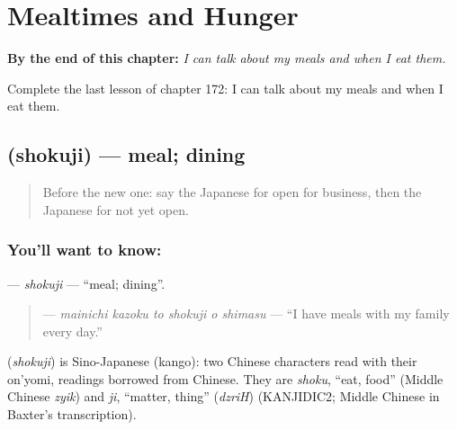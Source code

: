 
\chapter{Mealtimes and Hunger}
\label{ch:ja-mealtimes-and-hunger}

\begin{chapteropening}
\textbf{By the end of this chapter:} \emph{I can talk about my meals and when I eat them.}

Complete the last lesson of chapter 172: I can talk about my meals and when I eat them.
\end{chapteropening}

\section[\texorpdfstring{\ja{しょくじ} (shokuji)}{しょくじ (shokuji)}]{ (shokuji) — meal; dining}

\label{lesson:JA-C172-shokuji}



\begin{quote}
Before the new one: say the Japanese for open for business, then the Japanese for not yet open.
\end{quote}

\subsection*{You'll want to know: }
\textbf{} — \emph{shokuji} — \textquotedblleft{}meal; dining\textquotedblright{}.

\begin{quote}
\textbf{   } — \emph{mainichi kazoku to shokuji o shimasu} — \textquotedblleft{}I have meals with my family every day.\textquotedblright{}
\end{quote}

\begin{cousinweb}
\textbf{} (\emph{shokuji}) is Sino-Japanese (kango): two Chinese characters read with their on'yomi, readings borrowed from Chinese. They are \emph{shoku}, \textquotedblleft{}eat, food\textquotedblright{} (Middle Chinese \emph{zyik}) and \emph{ji}, \textquotedblleft{}matter, thing\textquotedblright{} (\emph{dzriH}) (KANJIDIC2; Middle Chinese in Baxter's transcription).
\end{cousinweb}

